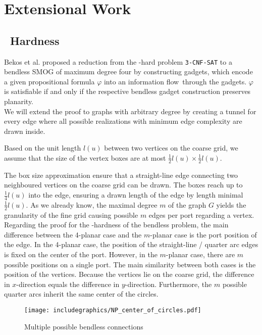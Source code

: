 \section{Extensional Work}
\subsection{\NP~Hardness}
Bekos et al. proposed a reduction from the \NP-hard problem \texttt{3-CNF-SAT} to a bendless SMOG of maximum degree four by constructing gadgets, which encode a given propositional formula $\varphi$ into an information \grqq flow\grqq~through the gadgets. $\varphi$ is satisfiable if and only if the respective bendless gadget construction preserves planarity.\\
We will extend the proof to graphs with arbitrary degree by creating a tunnel for every edge where all possible realizations with minimum edge complexity are drawn inside.
\begin{assumption} Based on the unit length $l(u)$ between two vertices on the coarse grid, we assume that the size of the vertex boxes are at most $\frac{1}{2}l(u) \times \frac{1}{2}l(u)$.\label{assumption}
\end{assumption}
The box size approximation ensure that a straight-line edge connecting two neighboured vertices on the coarse grid can be drawn. The boxes reach up to $\frac{1}{4}l(u)$ into the edge, ensuring a drawn length of the edge by length minimal $\frac{1}{2}l(u)$. As we already know, the maximal degree $m$ of the graph $G$ yields the granularity of the fine grid causing possible $m$ edges per port regarding a vertex.\\
Regarding the proof for the \NP-hardness of the bendless problem, the main difference between the 4-planar case and the $m$-planar case is the port position of the edge. In the 4-planar case, the position of the straight-line / quarter arc edges is fixed on the center of the port. However, in the $m$-planar case, there are $m$ possible positions on a single port. The main similarity between both cases is the position of the vertices. Because the vertices lie on the coarse grid, the difference in $x$-direction equals the difference in $y$-direction. Furthermore, the $m$ possible quarter arcs inherit the same center of the circles.
\begin{figure}[h]
	\centering
	\texttt{[image: includegraphics/NP\_center\_of\_circles.pdf]}
	\caption{Multiple possible bendless connections}
	\label{im:mult_poss_connections}
\end{figure}
